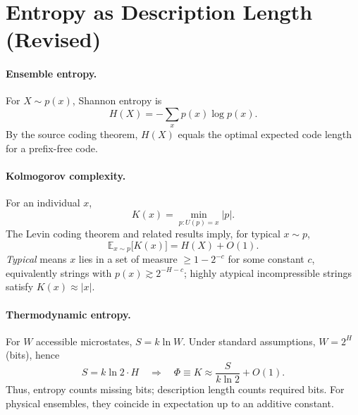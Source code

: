 \documentclass[aps,preprint,onecolumn,longbibliography,nofootinbib]{revtex4-2}
\numberwithin{equation}{section}
\begin{document}
\section{Entropy as Description Length (Revised)}\label{sec:entropy}
\paragraph*{Ensemble entropy.}
For $X\sim p(x)$, Shannon entropy is
\begin{equation}
H(X) = -\sum_x p(x)\log p(x). \label{eq:shannon}
\end{equation}
By the source coding theorem, $H(X)$ equals the optimal expected code length for a prefix-free code.

\paragraph*{Kolmogorov complexity.}
For an individual $x$,
\begin{equation}
K(x) = \min_{p:U(p)=x} |p|. \label{eq:kolmogorov}
\end{equation}
The Levin coding theorem and related results imply, for typical $x\sim p$,
\begin{equation}
\mathbb{E}_{x\sim p}\!\big[K(x)\big] = H(X) + O(1). \label{eq:levinbridge}
\end{equation}
\emph{Typical} means $x$ lies in a set of measure $\ge 1-2^{-c}$ for some constant $c$, equivalently strings with $p(x)\gtrsim 2^{-H-c}$; highly atypical incompressible strings satisfy $K(x)\approx |x|$.

\paragraph*{Thermodynamic entropy.}
For $W$ accessible microstates, $S = k \ln W$. Under standard assumptions, $W = 2^{H}$ (bits), hence
\begin{equation}
S = k\ln 2 \cdot H \quad \Rightarrow \quad \Phi \equiv K \approx \frac{S}{k\ln 2} + O(1). \label{eq:bridge}
\end{equation}
Thus, entropy counts missing bits; description length counts required bits. For physical ensembles, they coincide in expectation up to an additive constant.
\end{document}
